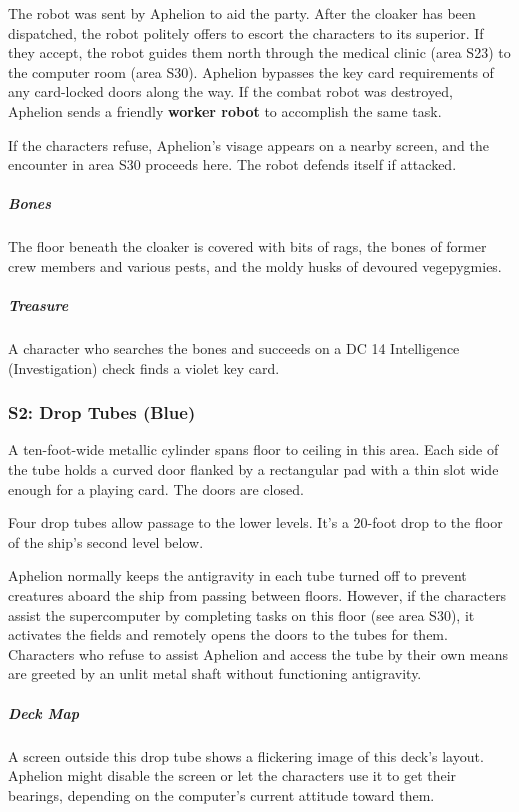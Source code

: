 \documentclass[10pt,a4paper,twoside,bg=print,twocolumn,openany,nodeprecatedcode]{dndbook}
\begin{document}
The robot was sent by Aphelion to aid the party. After the cloaker has been dispatched, the robot politely offers to escort the characters to its superior. If they accept, the robot guides them north through the medical clinic (area S23) to the computer room (area S30). Aphelion bypasses the key card requirements of any card-locked doors along the way. If the combat robot was destroyed, Aphelion sends a friendly \textbf{worker robot} to accomplish the same task.

If the characters refuse, Aphelion's visage appears on a nearby screen, and the encounter in area S30 proceeds here. The robot defends itself if attacked.

\subparagraph{Bones}
The floor beneath the cloaker is covered with bits of rags, the bones of former crew members and various pests, and the moldy husks of devoured vegepygmies.

\subparagraph{Treasure}
A character who searches the bones and succeeds on a DC 14 Intelligence (Investigation) check finds a violet key card.

\subsubsection{S2: Drop Tubes (Blue)}
\begin{DndReadAloud}{}
A ten-foot-wide metallic cylinder spans floor to ceiling in this area. Each side of the tube holds a curved door flanked by a rectangular pad with a thin slot wide enough for a playing card. The doors are closed.

\end{DndReadAloud}

Four drop tubes allow passage to the lower levels. It's a 20-foot drop to the floor of the ship's second level below.

Aphelion normally keeps the antigravity in each tube turned off to prevent creatures aboard the ship from passing between floors. However, if the characters assist the supercomputer by completing tasks on this floor (see area S30), it activates the fields and remotely opens the doors to the tubes for them. Characters who refuse to assist Aphelion and access the tube by their own means are greeted by an unlit metal shaft without functioning antigravity.

\subparagraph{Deck Map}
A screen outside this drop tube shows a flickering image of this deck's layout. Aphelion might disable the screen or let the characters use it to get their bearings, depending on the computer's current attitude toward them.
\end{document}
